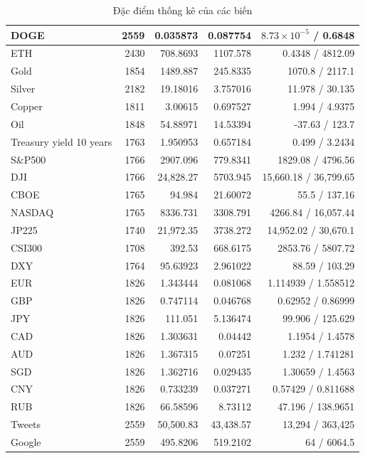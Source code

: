 \begin{table}[h]
{\begin{tabular}{|l|r|r|r|r|}
        DOGE & 2559 & 0.035873 & 0.087754 & $8.73 \times 10^{-5}$ / 0.6848 \\ \hline
        ETH & 2430 & 708.8693 & 1107.578 & 0.4348 / 4812.09 \\ \hline
        Gold & 1854 & 1489.887 & 245.8335 & 1070.8 / 2117.1 \\ \hline
        Silver & 2182 & 19.18016 & 3.757016 & 11.978 / 30.135 \\ \hline
        Copper & 1811 & 3.00615 & 0.697527 & 1.994 / 4.9375 \\ \hline
        Oil & 1848 & 54.88971 & 14.53394 & -37.63 / 123.7 \\ \hline
        Treasury yield 10 years & 1763 & 1.950953 & 0.657184 & 0.499 / 3.2434 \\ \hline
        S\&P500 & 1766 & 2907.096 & 779.8341 & 1829.08 / 4796.56 \\ \hline
        DJI & 1766 & 24,828.27 & 5703.945 & 15,660.18 / 36,799.65 \\ \hline
        CBOE & 1765 & 94.984 & 21.60072 & 55.5 / 137.16 \\ \hline
        NASDAQ & 1765 & 8336.731 & 3308.791 & 4266.84 / 16,057.44 \\ \hline
        JP225 & 1740 & 21,972.35 & 3738.272 & 14,952.02 / 30,670.1 \\ \hline
        CSI300 & 1708 & 392.53 & 668.6175 & 2853.76 / 5807.72 \\ \hline
        DXY & 1764 & 95.63923 & 2.961022 & 88.59 / 103.29 \\ \hline
        EUR & 1826 & 1.343444 & 0.081068 & 1.114939 / 1.558512 \\ \hline
        GBP & 1826 & 0.747114 & 0.046768 & 0.62952 / 0.86999 \\ \hline
        JPY & 1826 & 111.051 & 5.136474 & 99.906 / 125.629 \\ \hline
        CAD & 1826 & 1.303631 & 0.04442 & 1.1954 / 1.4578 \\ \hline
        AUD & 1826 & 1.367315 & 0.07251 & 1.232 / 1.741281 \\ \hline
        SGD & 1826 & 1.362716 & 0.029435 & 1.30659 / 1.4563 \\ \hline
        CNY & 1826 & 0.733239 & 0.037271 & 0.57429 / 0.811688 \\ \hline
        RUB & 1826 & 66.58596 & 8.73112 & 47.196 / 138.9651 \\ \hline
        Tweets & 2559 & 50,500.83 & 43,438.57 & 13,294 / 363,425 \\ \hline
        Google & 2559 & 495.8206 & 519.2102 & 64 / 6064.5 \\ \hline
    \end{tabular}}
    \caption{Đặc điểm thống kê của các biến}
    \label{tab:explanatory_variables}
\end{table}

